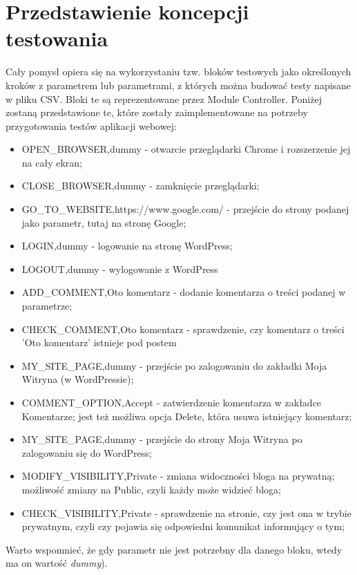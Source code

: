 \section{Przedstawienie koncepcji testowania}

Cały pomysł opiera się na wykorzystaniu tzw. bloków testowych jako określonych kroków z parametrem lub parametrami, z których można budować testy napisane w pliku CSV. Bloki te są reprezentowane przez Module Controller. Poniżej zostaną przedstawione te, które zostały zaimplementowane na potrzeby przygotowania testów aplikacji webowej:

\begin{itemize}
\item OPEN\_BROWSER,dummy - otwarcie przeglądarki Chrome i rozszerzenie jej na cały ekran;
\item CLOSE\_BROWSER,dummy - zamknięcie przeglądarki;
\item GO\_TO\_WEBSITE,https://www.google.com/ - przejście do strony podanej jako parametr, tutaj na stronę Google;
\item LOGIN,dummy - logowanie na stronę WordPress;
\item LOGOUT,dummy - wylogowanie z WordPress
\item ADD\_COMMENT,Oto komentarz - dodanie komentarza o treści podanej w parametrze;
\item CHECK\_COMMENT,Oto komentarz - sprawdzenie, czy komentarz o treści 'Oto komentarz' istnieje pod postem
\item MY\_SITE\_PAGE,dummy - przejście po zalogowaniu do zakładki Moja Witryna (w WordPressie); 
\item COMMENT\_OPTION,Accept - zatwierdzenie komentarza w zakładce Komentarze; jest też możliwa opcja Delete, która usuwa istniejący komentarz;
\item MY\_SITE\_PAGE,dummy - przejście do strony Moja Witryna po zalogowaniu się do WordPress;
\item MODIFY\_VISIBILITY,Private - zmiana widoczności bloga na prywatną; możliwość zmiany na Public, czyli każdy może widzieć bloga;
\item CHECK\_VISIBILITY,Private - sprawdzenie na stronie, czy jest ona w trybie prywatnym, czyli czy pojawia się odpowiedni komunikat informujący o tym; 
\end{itemize}

Warto wspomnieć, że gdy parametr nie jest potrzebny dla danego bloku, wtedy ma on wartość \textit{dummy}).



